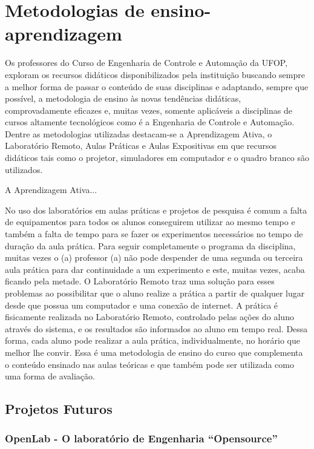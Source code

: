 \chapter{Metodologias de ensino-aprendizagem} 
\label{cap:05} 
Os professores do Curso de Engenharia de Controle e Automação da UFOP, exploram os recursos didáticos disponibilizados pela instituição buscando sempre a melhor forma de passar o conteúdo de suas disciplinas e adaptando, sempre que possível, a metodologia de ensino às novas tendências didáticas, comprovadamente eficazes e, muitas vezes, somente aplicáveis a disciplinas de cursos  altamente tecnológicos como é a Engenharia de Controle e Automação. Dentre as metodologias utilizadas destacam-se a Aprendizagem Ativa, o Laboratório Remoto, Aulas Práticas e Aulas Expositivas em que recursos didáticos tais como o projetor, simuladores em computador e o quadro branco são utilizados.   

A  Aprendizagem Ativa...

No uso dos laboratórios em aulas práticas e projetos de pesquisa é comum a falta de equipamentos para todos os alunos conseguirem utilizar ao mesmo tempo e também a falta de tempo para se fazer os experimentos necessários no tempo de duração da aula prática. Para seguir completamente o programa da disciplina, muitas vezes o (a) professor (a) não pode despender de uma segunda ou terceira aula prática para dar continuidade a um experimento e este, muitas vezes, acaba ficando pela metade. O Laboratório Remoto traz uma solução para esses problemas ao possibilitar que o aluno realize a prática a partir de qualquer lugar desde que possua um computador e uma conexão de internet. A prática é fisicamente realizada no Laboratório Remoto, controlado pelas ações do aluno através do sistema, e os resultados são informados ao aluno em tempo real. Dessa forma, cada aluno pode realizar a aula prática, individualmente, no horário que melhor lhe convir. Essa é uma metodologia de ensino do curso que complementa o conteúdo ensinado nas aulas teóricas e que também pode ser utilizada como uma forma de avaliação.

\section{Projetos Futuros}

\subsection*{OpenLab - O laboratório de Engenharia ``Opensource''}

